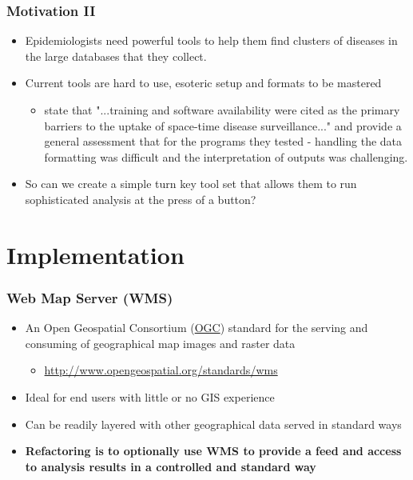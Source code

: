 \documentclass{beamer}
\begin{document}
\begin{frame}[t]
\frametitle{Motivation II}
\begin{itemize}
  \item Epidemiologists need powerful tools to help them find clusters of diseases in the large databases that they collect.
  \item Current tools are hard to use, esoteric setup and formats to be mastered
  \begin{itemize}
    \item \citet{citeulike:6854836} state that "...training and software availability were cited as the primary barriers to the uptake of space-time disease surveillance..." and provide a general assessment that for the programs they tested - handling the data formatting was difficult and the interpretation of outputs was challenging.
  \end{itemize}
  \item So can we create a simple turn key tool set that allows them to run sophisticated analysis at the press of a button?
\end{itemize}
\end{frame}


\section{Implementation}

\begin{frame}[t]
\frametitle{Web Map Server (WMS)}
\begin{itemize}
  \item An Open Geospatial Consortium (\href{http://www.opengeospatial.org/}{OGC}) standard for the serving and consuming of geographical map images and raster data
  \begin{itemize}
    \item \href{http://www.opengeospatial.org/standards/wms}{http://www.opengeospatial.org/standards/wms}
  \end{itemize}
  \item Ideal for end users with little or no GIS experience
  \item Can be readily layered with other geographical data served in standard ways
  \item \textbf{Refactoring is to optionally use WMS to provide a feed and access to analysis results in a controlled and standard way}
\end{itemize}
\end{frame}
\end{document}

